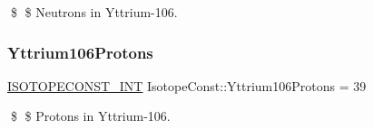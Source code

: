 \$ \$ Neutrons in Yttrium-\/106. \mbox{\label{group___isotope_const-_yttrium-_y106_ga05cc19fd8754b43910334d6cb1b7a0d7}} 
\subsubsection{\texorpdfstring{Yttrium106\+Protons}{Yttrium106Protons}}
{\footnotesize\ttfamily \mbox{\hyperlink{group___isotope_const-_macros_ga5f18360b3e99483a35c32d789e62621c}{I\+S\+O\+T\+O\+P\+E\+C\+O\+N\+S\+T\+\_\+\+I\+NT}} Isotope\+Const\+::\+Yttrium106\+Protons = 39}

\$ \$ Protons in Yttrium-\/106. 